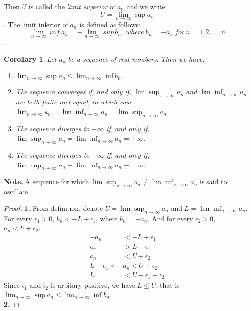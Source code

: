\documentclass{article}
\newtheorem{corollary}[theorem]{Corollary}
\theoremstyle{definition}
\begin{document}
Then $U$ is called the \textit{limit superior} of ${a_{n}}$
and we write $$U=\lim_{n\rightarrow \infty}\sup{a_{n}}$$.
The limit inferior of ${a_{n}}$ is defined as follows:
$$\lim_{n\rightarrow \infty}\ inf\ a_{n}=-\lim_{n\rightarrow \infty}\ sup\ b_{n},\ where\ b_{n}=-a_{n}\ for\ n=1,2,...,n$$.

\begin{corollary}
    Let $a_{n}$ be a sequence of real numbers. Then we have:
    \begin{enumerate}
        \item $\lim_{n\rightarrow \infty}\sup a_{n}\leq\lim_{n\rightarrow \infty}\inf b_{n}$.
        \item The sequence converges if, and only if, $\lim\sup_{n\rightarrow \infty}a_{n}$ and 
        $\lim\inf_{n\rightarrow \infty}a_{n}$ are both finite and equal, in which case 
        $\lim_{n\rightarrow \infty}a_{n}=\lim\inf_{n\rightarrow \infty}a_{n}=\lim\sup_{n\rightarrow \infty}a_{n}$.
        \item The sequence diverges to $+\infty$ if, and only if, $\lim\sup_{n\rightarrow \infty}a_{n}=\lim\inf_{n\rightarrow \infty}a_{n}=+\infty$.
        \item The sequence diverges to $-\infty$ if, and only if, $\lim\sup_{n\rightarrow \infty}a_{n}=\lim\inf_{n\rightarrow \infty}a_{n}=-\infty$.
    \end{enumerate}
    \end{corollary}
    
    
    \textbf{Note.} A sequence for which $\lim\sup_{n\rightarrow \infty}a_{n}\neq\lim\inf_{n\rightarrow \infty}a_{n} $ is said to oscillate.\\
    \begin{proof}
    \textbf{1.}
    From definition, denote $U=\lim\sup_{n\rightarrow \infty}a_{n}$ and $L=\lim\inf_{n\rightarrow \infty}a_{n}$.
    For every $\epsilon_{1}>0$, $b_{n}<-L+\epsilon_{1}$, where $b_{n}=-a_{n}$. And for every $\epsilon_{2}>0$, $a_{n}<U+\epsilon_{2}$.
    \begin{align*}
        -a_{n} &< -L + \epsilon_{1} \\
        a_{n} &> L - \epsilon_{1} \\
        a_{n} &< U + \epsilon_{2} \\
        L - \epsilon_{1} < &a_{n} < U + \epsilon_{2} \\
        L &< U + \epsilon_{1} + \epsilon_{2}
    \end{align*}
    Since $\epsilon_{1}$ and $\epsilon_{2}$ is arbitary positive, 
    we have $L\leq U$, that is $\lim_{n\rightarrow \infty}\sup a_{n}\leq\lim_{n\rightarrow \infty}\inf b_{n}$.\\
    \textbf{2.}
    
    \end{proof}
\end{document}
